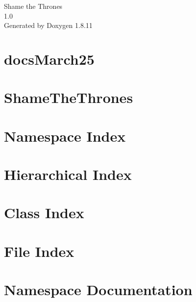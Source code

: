 \documentclass[twoside]{book}
\newcommand{\+}{\discretionary{\mbox{\scriptsize$\hookleftarrow$}}{}{}}
\newcommand{\clearemptydoublepage}{%
  \newpage{\pagestyle{empty}\cleardoublepage}%
}
\begin{document}
\hypersetup{pageanchor=false,
             bookmarksnumbered=true,
             pdfencoding=unicode
            }
\begin{titlepage}
\vspace*{7cm}
\begin{center}%
{\Large Shame the Thrones \\[1ex]\large 1.\+0 }\\
\vspace*{1cm}
{\large Generated by Doxygen 1.8.11}\\
\end{center}
\end{titlepage}
\clearemptydoublepage
\tableofcontents
\clearemptydoublepage
{}
\hypersetup{pageanchor=true}

\chapter{docs\+March25}
\label{md_docs_docsMarch25}
\hypertarget{md_docs_docsMarch25}{}

\chapter{Shame\+The\+Thrones}
\label{md_README}
\hypertarget{md_README}{}

\chapter{Namespace Index}

\chapter{Hierarchical Index}

\chapter{Class Index}

\chapter{File Index}

\chapter{Namespace Documentation}









\end{document}
